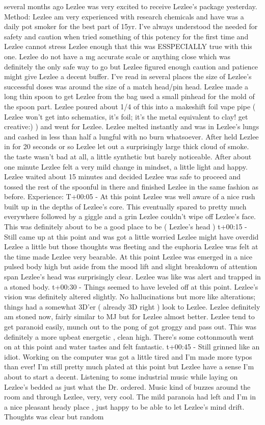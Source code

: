\documentclass[12pt]{book}
\begin{document}
several months ago Lezlee was very excited to receive Lezlee's package yesterday. Method: Lezlee am very experienced with research chemicals and have was a daily pot smoker for the best part of 15yr. I've always understood the needed for safety and caution when tried something of this potency for the first time and Lezlee cannot stress Lezlee enough that this was ESSPECIALLY true with this one. Lezlee do not have a mg accurate scale or anything close which was definitely the only safe way to go but Lezlee figured enough caution and patience might give Lezlee a decent buffer. I've read in several places the size of Lezlee's successful doses was around the size of a match head/pin head. Lezlee made a long thin spoon to get Lezlee from the bag used a small pinhead for the mold of the spoon part. Lezlee poured about 1/4 of this into a makeshift foil vape pipe ( Lezlee won't get into schematics, it's foil; it's the metal equivalent to clay! get creative:) ) and went for Lezlee. Lezlee melted instantly and was in Lezlee's lungs and cashed in less than half a lungful with no burn whatsoever. After held Lezlee in for 20 seconds or so Lezlee let out a surprisingly large thick cloud of smoke. the taste wasn't bad at all, a little synthetic but barely noticeable. After about one minute Lezlee felt a very mild change in mindset, a little light and happy. Lezlee waited about 15 minutes and decided Lezlee was safe to proceed and tossed the rest of the spoonful in there and finished Lezlee in the same fashion as before. Experience: T+00:05 - At this point Lezlee was well aware of a nice rush built up in the depths of Lezlee's core. This eventually spared to pretty much everywhere followed by a giggle and a grin Lezlee couldn't wipe off Lezlee's face. This was definitely about to be a good place to be ( Lezlee's head ) t+00:15 - Still came up at this point and was got a little worried Lezlee might have overdid Lezlee a little but those thoughts was fleeting and the euphoria Lezlee was felt at the time made Lezlee very bearable. At this point Lezlee was emerged in a nice pulsed body high but aside from the mood lift and slight breakdown of attention span Lezlee's head was surprisingly clear. Lezlee was like was alert and trapped in a stoned body. t+00:30 - Things seemed to have leveled off at this point. Lezlee's vision was definitely altered slightly. No hallucinations but more like alterations; things had a somewhat 3D'er ( already 3D right ) look to Lezlee. Lezlee definitely am stoned now, fairly similar to MJ but for Lezlee almost better. Lezlee tend to get paranoid easily, munch out to the pong of got groggy and pass out. This was definitely a more upbeat energetic , clean high. There's some cottonmouth went on at this point and water tastes and felt fantastic. t+00:45 - Still grinned like an idiot. Working on the computer was got a little tired and I'm made more typos than ever! I'm still pretty much plated at this point but Lezlee have a sense I'm about to start a decent. Listening to some industrial music while laying on Lezlee's bedded as just what the Dr. ordered. Music kind of buzzes around the room and through Lezlee, very, very cool. The mild paranoia had left and I'm in a nice pleasant heady place , just happy to be able to let Lezlee's mind drift. Thoughts was clear but random 
\end{document}
